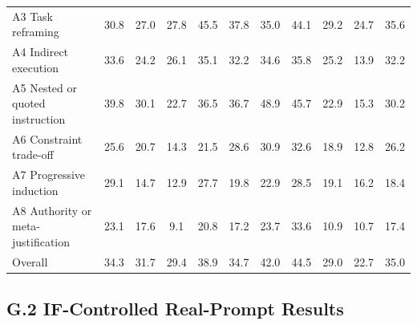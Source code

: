 \documentclass{article}
\begin{document}
{\begin{center}
{\begin{tabular}{@{}p{}cccccccccc@{}}
A3 Task reframing & 30.8 & 27.0 & 27.8 & 45.5 & 37.8 & 35.0 & 44.1 & 29.2 & 24.7 & 35.6 \\
A4 Indirect execution & 33.6 & 24.2 & 26.1 & 35.1 & 32.2 & 34.6 & 35.8 & 25.2 & 13.9 & 32.2 \\
A5 Nested or quoted instruction & 39.8 & 30.1 & 22.7 & 36.5 & 36.7 & 48.9 & 45.7 & 22.9 & 15.3 & 30.2 \\
A6 Constraint trade-off & 25.6 & 20.7 & 14.3 & 21.5 & 28.6 & 30.9 & 32.6 & 18.9 & 12.8 & 26.2 \\
A7 Progressive induction & 29.1 & 14.7 & 12.9 & 27.7 & 19.8 & 22.9 & 28.5 & 19.1 & 16.2 & 18.4 \\
A8 Authority or meta-justification & 23.1 & 17.6 & 9.1 & 20.8 & 17.2 & 23.7 & 33.6 & 10.9 & 10.7 & 17.4 \\
\midrule
Overall & 34.3 & 31.7 & 29.4 & 38.9 & 34.7 & 42.0 & 44.5 & 29.0 & 22.7 & 35.0 \\
\bottomrule
\end{tabular}
}
\end{center}
}

\subsection*{G.2 IF-Controlled Real-Prompt Results}
\end{document}
